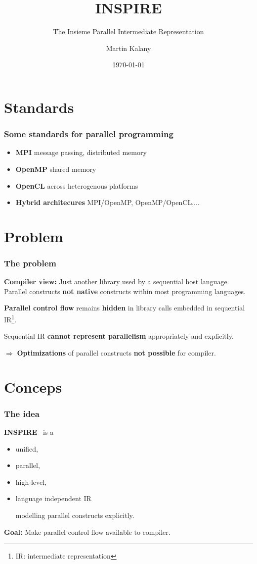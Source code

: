 \documentclass{beamer}
\title{INSPIRE}
\subtitle{The Insieme Parallel Intermediate Representation}
\author{Martin Kalany}
\institute
{
  Graduate student in Computer Science\\
  Vienna University of Technology\\
}
\date{\today}
\newcommand\fR[1]{\textcolor{red!80!black}{\textbf{#1}}}
\newcommand\fB[1]{\textcolor{blue!80!black}{\textbf{#1}}}
\newcommand\fG[1]{\textcolor{green!70!black}{\textbf{#1}}}
\begin{document}
\maketitle

\section{Standards}
\begin{frame}
\frametitle{Some standards for parallel programming}
\begin{itemize}
\item \fB{MPI} message passing, distributed memory
\item \fB{OpenMP} shared memory
\item \fB{OpenCL} across heterogenous platforms

\bigskip
\item \fB{Hybrid architecures} MPI/OpenMP, OpenMP/OpenCL,...
\end{itemize}
\end{frame}

\section{Problem}
\begin{frame}
\frametitle{The problem}

\fB{Compiler view:} Just another library used by a sequential host language. Parallel constructs \fR{not native} constructs within most programming languages.

\bigskip\pause
\fR{Parallel control flow} remains \fR{hidden} in library calls embedded in sequential IR\footnote{IR: intermediate representation}.

\bigskip\pause
Sequential IR \fR{cannot represent parallelism} appropriately and explicitly.

\bigskip\pause
$\Rightarrow$ \fR{Optimizations} of parallel constructs \fR{not possible} for compiler. 
\end{frame}

\section{Conceps}
\begin{frame}
\frametitle{The idea}
\fB{INSPIRE}~\cite{JordanPTKF13}  is a
\begin{itemize}
\item unified,
\item parallel,
\item high-level,
\item language independent IR

\smallskip
modelling parallel constructs explicitly.
\end{itemize}
\bigskip\pause
\fG{Goal:} Make parallel control flow available to compiler.
\end{frame}
\end{document}

